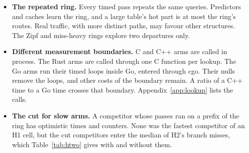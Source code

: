 \begin{itemize}
lookup uses are reproduced in a small shim. They are the reset of the context, the method's tree and
the search in gin's default configuration. chi's arm uses a similar shim of its multiplexer. A shim
can differ from the engine it stands for.
\item \textbf{The repeated ring.} Every timed pass repeats the same \RingSize{} queries. Predictors and
caches learn the ring, and a large table's hot part is at most the ring's routes. Real traffic, with
more distinct paths, may favour other structures. The Zipf and miss-heavy rings explore two departures
only.
\item \textbf{Different measurement boundaries.} C and C++ arms are called in process.
The Rust arms are called through one C function per lookup.
The Go arms run their timed loops inside Go, entered through cgo.
Their nulls remove the loops, and other costs of the boundary remain.
A ratio of a C++ time to a Go time crosses that boundary.
Appendix~\ref{app:lookup} lists the calls.
\item \textbf{The cut for slow arms.} A competitor whose passes ran on a prefix of the ring has
optimistic times and counters. None was the fastest competitor of an H1 cell, but the cut competitors
enter the median of H2's branch misses, which Table~\ref{tab:htwo} gives with and without them.
\end{itemize}
